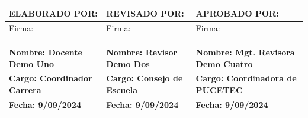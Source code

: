 \begin{tabularx}{\textwidth}{|X|X|X|}
    \hline
    \textbf{ELABORADO POR:} & \textbf{REVISADO POR:} & \textbf{APROBADO POR:} \\ \hline
    Firma: & Firma: & Firma:\\
    &&\\
    &&\\
    &&\\ \hline
    \textbf{Nombre: Docente Demo Uno} & \textbf{Nombre: Revisor Demo Dos} & \textbf{Nombre: Mgt. Revisora Demo Cuatro} \\ \hline
    \textbf{Cargo: Coordinador Carrera} & \textbf{Cargo: Consejo de Escuela} & \textbf{Cargo: Coordinadora de PUCETEC} \\ \hline
    \textbf{Fecha: 9/09/2024} & \textbf{Fecha: 9/09/2024} & \textbf{Fecha: 9/09/2024} \\ \hline
    \end{tabularx}
